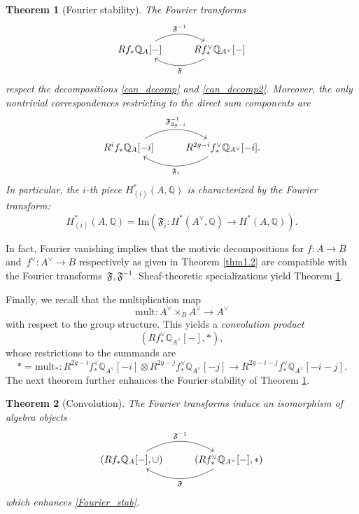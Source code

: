 \documentclass[11pt]{amsart}
\theoremstyle{plain}
\newtheorem{thm}{Theorem}[section]
\theoremstyle{definition}
\theoremstyle{remark}
\newcommand{\BQ}{{\mathbb{Q}}}
\begin{document}
\begin{thm}[Fourier stability]\label{thm1.3_2}
    The Fourier transforms
\begin{equation}\label{Fourier_stab}
\begin{tikzcd}
Rf_*\BQ_A[-] \arrow[r, bend left=30, "{\mathfrak{F}^{-1}}"] 
  & Rf^\vee_* \BQ_{A^\vee}[-] \arrow[l, bend left=30, "{\mathfrak{F}}"]
\end{tikzcd}
\end{equation}
respect the decompositions \eqref{can_decomp} and \eqref{can_decomp2}. Moreover, the only nontrivial correspondences restricting to the direct sum components are
\[
\begin{tikzcd}
R^if_*\BQ_A[-i] \arrow[r, bend left=30, "{\mathfrak{F}_{2g-i}^{-1}}"] 
  & R^{2g-i}f^\vee_* \BQ_{A^\vee}[-i] \arrow[l, bend left=30, "{\mathfrak{F}_i}"].
\end{tikzcd}
\]
In particular, the $i$-th piece $H^*_{(i)}(A, \BQ)$ is characterized by the Fourier transform:
\begin{equation}\label{P=C_0}
H_{(i)}^*(A, \BQ) = \mathrm{Im}\left( \mathfrak{F}_{i}: H^*(A^\vee, \BQ) \to H^*(A, \BQ) \right).
\end{equation}
\end{thm}

In fact, Fourier vanishing implies that the motivic decompositions for $f: A\to B$ and~$f^\vee: A^\vee \to B$ respectively as given in Theorem \ref{thm1.2} are compatible with the Fourier transforms~$\mathfrak{F}, \mathfrak{F}^{-1}$. Sheaf-theoretic specializations yield Theorem \ref{thm1.3_2}.

Finally, we recall that the multiplication map 
\begin{equation}\label{mult_0}
\mathrm{mult}: A^\vee \times_B A^\vee \to A^\vee
\end{equation}
with respect to the group structure. This yields a \emph{convolution product}
\[
\left( Rf^\vee_* \BQ_{A^\vee}[-], \ast \right),
\]
whose restrictions to the summands are 
\[
* = \mathrm{mult}_*: R^{2g-i}f^\vee_*\BQ_{A^\vee}[-i] \otimes R^{2g-j}f^\vee_* \BQ_{A^\vee}[-j] \to  R^{2g-i-j}f^\vee_*\BQ_{A^\vee}[-i-j].
\]
The next theorem further enhances the Fourier stability of Theorem \ref{thm1.3_2}.

\begin{thm}[Convolution]\label{thm1.3_3}
The Fourier transforms induce an isomorphism of algebra objects
    \[
\begin{tikzcd}
\left(Rf_*\BQ_A[-], \cup\right) \arrow[r, bend left=30, "{\mathfrak{F}^{-1}}"] 
  & \left(Rf^\vee_* \BQ_{A^\vee}[-], \ast\right) \arrow[l, bend left=30, "{\mathfrak{F}}"]
\end{tikzcd}
\]
which enhances \eqref{Fourier_stab}.
\end{thm}
\end{document}
